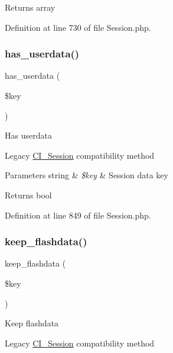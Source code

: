 \begin{DoxyReturn}{Returns}
array 
\end{DoxyReturn}


Definition at line 730 of file Session.\+php.

\mbox{\label{class_c_i___session_a25f39652bb0f716817e5e1e778729bea}} 
\subsubsection{\texorpdfstring{has\_userdata()}{has\_userdata()}}
{\footnotesize\ttfamily has\+\_\+userdata (\begin{DoxyParamCaption}\item[{}]{\$key }\end{DoxyParamCaption})}

Has userdata

Legacy \mbox{\hyperlink{class_c_i___session}{C\+I\+\_\+\+Session}} compatibility method


\begin{DoxyParams}[1]{Parameters}
string & {\em \$key} & Session data key \\
\hline
\end{DoxyParams}
\begin{DoxyReturn}{Returns}
bool 
\end{DoxyReturn}


Definition at line 849 of file Session.\+php.

\mbox{\label{class_c_i___session_a1e25514ba8dbd132db06cbedc6412158}} 
\subsubsection{\texorpdfstring{keep\_flashdata()}{keep\_flashdata()}}
{\footnotesize\ttfamily keep\+\_\+flashdata (\begin{DoxyParamCaption}\item[{}]{\$key }\end{DoxyParamCaption})}

Keep flashdata

Legacy \mbox{\hyperlink{class_c_i___session}{C\+I\+\_\+\+Session}} compatibility method


